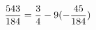 \documentclass[preview]{standalone}
\begin{document}
\begin{align*}
\special{dvisvgm:raw <g id='unique000'>}\frac{543}{184} = \frac{3}{4} - 9(- \frac{45}{184})\special{dvisvgm:raw </g>}
\end{align*}
\end{document}
